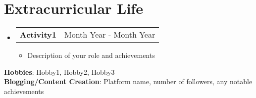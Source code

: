 \documentclass[letterpaper,11pt]{article}
\makeatletter
\newcommand{\resumeItem}[1]{
  \item\small{
    {#1 \vspace{-2pt}}
  }
}
\newcommand{\resumeProjectHeading}[2]{
    \item
    \begin{tabular*}{0.97\textwidth}{l@{\extracolsep{\fill}}r}
      \small#1 & #2 \\
    \end{tabular*}\vspace{-7pt}
}
\newcommand{\resumeSubHeadingListStart}{\begin{itemize}[leftmargin=0.15in, label={}]}
\newcommand{\resumeSubHeadingListEnd}{\end{itemize}}
\newcommand{\resumeItemListStart}{\begin{itemize}}
\newcommand{\resumeItemListEnd}{\end{itemize}\vspace{-5pt}}
\makeatother
\begin{document}
\section{Extracurricular Life}
  \resumeSubHeadingListStart
    \resumeProjectHeading
      {\textbf{Activity1}}{Month Year - Month Year}
      \resumeItemListStart
        \resumeItem{Description of your role and achievements}
      \resumeItemListEnd
  \resumeSubHeadingListEnd

 \begin{itemize}[leftmargin=0.15in, label={}]
    \small{\item{
     \textbf{Hobbies}{: Hobby1, Hobby2, Hobby3} \\
     \textbf{Blogging/Content Creation}{: Platform name, number of followers, any notable achievements}
    }}
 \end{itemize}
\end{document}
